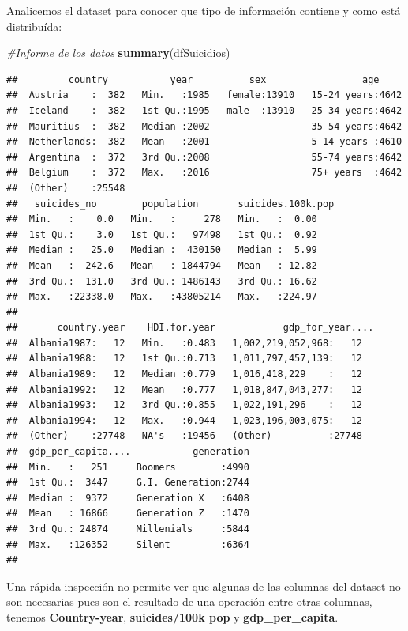 \documentclass[]{article}
\newenvironment{Shaded}{\begin{snugshade}}{\end{snugshade}}
\newcommand{\CommentTok}[1]{\textcolor[rgb]{0.56,0.35,0.01}{\textit{#1}}}
\newcommand{\KeywordTok}[1]{\textcolor[rgb]{0.13,0.29,0.53}{\textbf{#1}}}
\newcommand{\NormalTok}[1]{#1}
\begin{document}
Analicemos el dataset para conocer que tipo de información contiene y
como está distribuída:

\begin{Shaded}
\begin{Highlighting}[]
\CommentTok{#Informe de los datos}
\KeywordTok{summary}\NormalTok{(dfSuicidios)}
\end{Highlighting}
\end{Shaded}

\begin{verbatim}
##         country           year          sex                 age      
##  Austria    :  382   Min.   :1985   female:13910   15-24 years:4642  
##  Iceland    :  382   1st Qu.:1995   male  :13910   25-34 years:4642  
##  Mauritius  :  382   Median :2002                  35-54 years:4642  
##  Netherlands:  382   Mean   :2001                  5-14 years :4610  
##  Argentina  :  372   3rd Qu.:2008                  55-74 years:4642  
##  Belgium    :  372   Max.   :2016                  75+ years  :4642  
##  (Other)    :25548                                                   
##   suicides_no        population       suicides.100k.pop
##  Min.   :    0.0   Min.   :     278   Min.   :  0.00   
##  1st Qu.:    3.0   1st Qu.:   97498   1st Qu.:  0.92   
##  Median :   25.0   Median :  430150   Median :  5.99   
##  Mean   :  242.6   Mean   : 1844794   Mean   : 12.82   
##  3rd Qu.:  131.0   3rd Qu.: 1486143   3rd Qu.: 16.62   
##  Max.   :22338.0   Max.   :43805214   Max.   :224.97   
##                                                        
##       country.year    HDI.for.year            gdp_for_year....
##  Albania1987:   12   Min.   :0.483   1,002,219,052,968:   12  
##  Albania1988:   12   1st Qu.:0.713   1,011,797,457,139:   12  
##  Albania1989:   12   Median :0.779   1,016,418,229    :   12  
##  Albania1992:   12   Mean   :0.777   1,018,847,043,277:   12  
##  Albania1993:   12   3rd Qu.:0.855   1,022,191,296    :   12  
##  Albania1994:   12   Max.   :0.944   1,023,196,003,075:   12  
##  (Other)    :27748   NA's   :19456   (Other)          :27748  
##  gdp_per_capita....           generation  
##  Min.   :   251     Boomers        :4990  
##  1st Qu.:  3447     G.I. Generation:2744  
##  Median :  9372     Generation X   :6408  
##  Mean   : 16866     Generation Z   :1470  
##  3rd Qu.: 24874     Millenials     :5844  
##  Max.   :126352     Silent         :6364  
## 
\end{verbatim}

Una rápida inspección no permite ver que algunas de las columnas del
dataset no son necesarias pues son el resultado de una operación entre
otras columnas, tenemos \textbf{Country-year}, \textbf{suicides/100k
pop} y \textbf{gdp\_per\_capita}.
\end{document}
